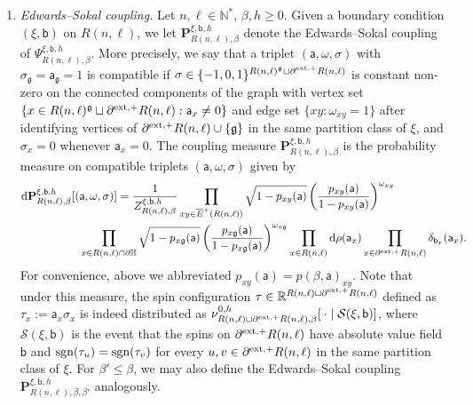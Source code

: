 \documentclass[11pt,a4paper]{article}
\numberwithin{equation}{section}
\theoremstyle{plain}
\theoremstyle{definition}
\newcommand\fg{\mathfrak{g}}
\begin{document}
\begin{enumerate}
    \item[$\bullet$] \textit{Edwards--Sokal coupling.}  Let $n,\ell \in \mathbb N^*$, $\beta,h \geq 0$. Given a boundary condition $(\xi,\mathsf b)$ on $R(n,\ell)$, we let $\mathbf P^{\xi,\mathsf b,h}_{R(n,\ell), \beta}$ denote the Edwards--Sokal coupling of $\Psi^{\xi,\mathsf b,h}_{R(n,\ell),\beta}$.
    More precisely, we say that a triplet $(\mathsf a, \omega, \sigma)$ with $\sigma_{\mathfrak g}=\mathsf{a}_{\mathfrak g}=1$ is compatible if $\sigma \in \{-1,0,1\}^{R(n,\ell)^\mathfrak g\sqcup \partial^{\textup{ext},+}R(n,\ell)}$ is constant non-zero on the connected components of 
the graph with vertex set $\{x\in R(n,\ell)^\fg\sqcup \partial^{\textup{ext},+}R(n,\ell): \mathsf{a}_x\neq 0\}$ and edge set $\{xy: \omega_{xy}=1\}$ 
after identifying vertices of $\partial^{\textup{ext},+}R(n,\ell)\cup \{\fg\}$ in the same partition class of $\xi$, and $\sigma_x=0$ whenever $\mathsf{a}_x=0$. The coupling measure $\mathbf P^{\xi,\mathsf b,h}_{R(n,\ell), \beta}$ is the probability measure on compatible triplets $(\mathsf{a},\omega,\sigma)$ given by
\begin{align}\label{eq:formula ES}
\begin{aligned}
\mathrm{d}\mathbf P^{\xi,\mathsf b, h}_{R(n,\ell), \beta}[(&\mathsf{a}, \omega,\sigma)]=
\frac{1}{Z^{\xi,\mathsf{b},h}_{R(n,\ell),\beta}} 
\prod_{xy\in \overline{E}^+(R(n,\ell))} \sqrt{1-p_{xy}(\mathsf{a})}\left(\frac{p_{xy}(\mathsf{a})}{1-p_{xy}(\mathsf{a})}\right)^{\omega_{xy}}  \\&\prod_{x\in R(n,\ell)\cap \partial \mathbb H} \sqrt{1-p_{x\fg}(\mathsf a)}\left(\frac{p_{x\fg}(\mathsf a)}{1-p_{x\fg}(\mathsf a)}\right)^{\omega_{x\fg}} \prod_{x\in R(n,\ell)} \mathrm{d}\rho(\mathsf{a}_x)\prod_{x \in \partial^{\textup{ext},+} R(n,\ell)} \delta_{\mathsf{b}_x}(\mathsf{a}_x).
\end{aligned}
\end{align}
For convenience, above we abbreviated $p_{xy}(\mathsf{a})=p(\beta,\mathsf{a})_{xy}$. Note that under this measure, the spin configuration $\tau\in \mathbb R^{R(n,\ell)\sqcup \partial^{\textup{ext},+}R(n,\ell)}$ defined as $\tau_x:=\mathsf a_x \sigma_x$ is indeed distributed as $\nu^{0,h}_{R(n,\ell)\sqcup \partial^{\textup{ext},+}R(n,\ell), \beta}[\: \cdot \mid \mathcal S(\xi, \mathsf b)]$, where $\mathcal S(\xi, \mathsf b)$ is the event that the spins on $\partial^{\textup{ext},+}R(n,\ell)$ have absolute value field $\mathsf b$ and $\textup{sgn}(\tau_u)=\textup{sgn}(\tau_v)$ for every $u,v \in \partial^{\textup{ext},+}R(n,\ell)$ in the same partition class of $\xi$.
 For $\beta'\leq\beta$, we may also define the Edwards--Sokal coupling $\mathbf P^{\xi,\mathsf b, h}_{R(n,\ell),\beta, \beta'}$ analogously.
\end{enumerate}
\end{document}
